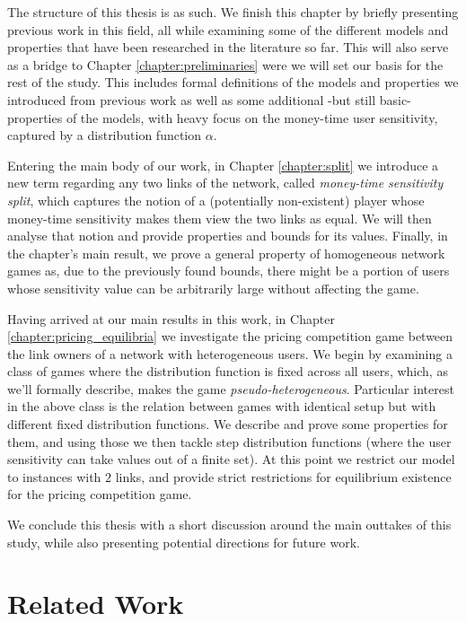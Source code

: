 \documentclass[10pt,a4paper]{book}
\theoremstyle{definition}
\theoremstyle{comment}
\begin{document}
The structure of this thesis is as such.
We finish this chapter by briefly presenting previous work in this field, all while examining some of the different models and properties that have been researched in the literature so far.
This will also serve as a bridge to Chapter \ref{chapter:preliminaries} were we will set our basis for the rest of the study.
This includes formal definitions of the models and properties we introduced from previous work as well as some additional -but still basic- properties of the models, with heavy focus on the money-time user sensitivity, captured by a distribution function $\alpha$.

Entering the main body of our work, in Chapter \ref{chapter:split} we introduce a new term regarding any two links of the network, called \textit{money-time sensitivity split}, which captures the notion of a (potentially non-existent) player whose money-time sensitivity makes them view the two links as equal.
We will then analyse that notion and provide properties and bounds for its values.
Finally, in the chapter's main result, we prove a general property of homogeneous network games as, due to the previously found bounds, there might be a portion of users whose sensitivity value can be arbitrarily large without affecting the game.

Having arrived at our main results in this work, in Chapter \ref{chapter:pricing_equilibria} we investigate the pricing competition game between the link owners of a network with heterogeneous users.
We begin by examining a class of games where the distribution function is fixed across all users, which, as we'll formally describe, makes the game \textit{pseudo-heterogeneous}.
Particular interest in the above class is the relation between games with identical setup but with different fixed distribution functions.
We describe and prove some properties for them, and using those we then tackle step distribution functions (where the user sensitivity can take values out of a finite set).
At this point we restrict our model to instances with $2$ links, and provide strict restrictions for equilibrium existence for the pricing competition game.

We conclude this thesis with a short discussion around the main outtakes of this study, while also presenting potential directions for future work.


\section{Related Work}
\label{section:related_work}
\end{document}
